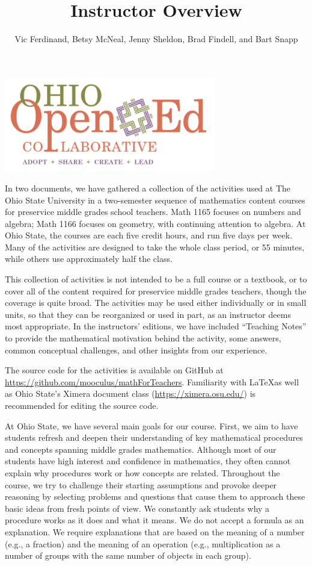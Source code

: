 \documentclass[nooutcomes]{ximera}
\title{Instructor Overview}
\author{Vic Ferdinand, Betsy McNeal, Jenny Sheldon, Brad Findell, and Bart Snapp}
\begin{document}
\begin{abstract}

\end{abstract}\maketitle

\includegraphics[height=1.6in]{OOECLogo.png}

In two documents, we have gathered a collection of the activities used at The Ohio State University in a 
two-semester sequence of mathematics content courses for preservice middle grades 
school teachers. Math 1165 focuses on numbers and algebra; Math 1166 focuses on geometry, with continuing attention to algebra.  At Ohio State, the courses are each five credit hours, and run five days per week.  Many of the activities are designed to take the whole class period, or 55 minutes, while others use approximately half the class.  

This collection of activities is not intended to be a full course or a textbook, or to cover all of the 
content required for preservice middle grades teachers, though the coverage is quite broad.  The activities 
may be used either individually or in small units, so that they can be reorganized or used in part, as an 
instructor deems most appropriate.  In the instructors' editions, we have included ``Teaching Notes'' to provide the mathematical motivation behind the activity, some answers, common conceptual challenges, and other insights from our experience.  

The source code for the activities is available on GitHub at \url{https://github.com/mooculus/mathForTeachers}.  Familiarity with \LaTeX as well as Ohio State's Ximera document class (\url{https://ximera.osu.edu/}) is recommended for editing the source code.

At Ohio State, we have several main goals for our course.  First, we aim to have students refresh 
and deepen their understanding of key mathematical procedures and concepts spanning middle grades 
mathematics.  Although most of our students have high interest and confidence in mathematics, they often 
cannot explain why procedures work or how concepts are related.  Throughout the 
course, we try to challenge their starting assumptions and provoke deeper reasoning by selecting 
problems and questions that cause them to approach these basic ideas from fresh 
points of view.  We constantly ask students why a procedure works as it does and what it 
means.  We do not accept a formula as an explanation.  We require explanations that are
based on the meaning of a number (e.g., a fraction) and the meaning of an operation (e.g., 
multiplication as a number of groups with the same number of objects in each group).
\end{document}
